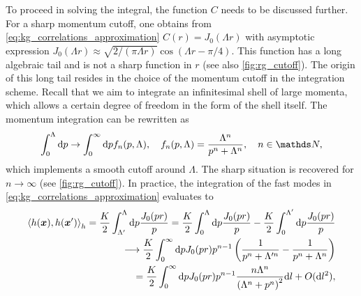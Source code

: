 To proceed in solving the integral, the function $C$ needs to be discussed further.
For a sharp momentum cutoff, one obtains from \cref{eq:kg_correlations_approximation} $C(r) = J_0(\Lambda r)$ with asymptotic expression $J_0(\Lambda r)\approx\sqrt{2/(\pi \Lambda r)}\cos(\Lambda r-\pi/4)$.
This function has a long algebraic tail and is not a sharp function in $r$ (see also \cref{fig:rg_cutoff}).
The origin of this long tail resides in the choice of the momentum cutoff in the integration scheme.
Recall that we aim to integrate an infinitesimal shell of large momenta, which allows a certain degree of freedom in the form of the shell itself.
The momentum integration can be rewritten as
\begin{align}
    \int_{0}^{\Lambda}\rd p \rightarrow \int_{0}^\infty\rd p f_n(p,\Lambda),
    \quad
    f_n(p,\Lambda) = \frac{\Lambda^n}{p^n+\Lambda^n},
    \quad
    n\in\mathds N,
    \label{eq:integral_cutoff}
\end{align}
which implements a smooth cutoff around $\Lambda$.
The sharp situation is recovered for $n\rightarrow\infty$ (see \cref{fig:rg_cutoff}).
In practice, the integration of the fast modes in \cref{eq:kg_correlations_approximation} evaluates to
\begin{align}
    \braket{h({\bm x}),h(\bm x')}_h = \frac K2\int_{\Lambda'}^\Lambda\mathrm d p\frac{J_0(p r)}{p} = \frac K2\int_{0}^\Lambda\mathrm d p\frac{J_0(p r)}{p}
    -\frac K2\int_{0}^{\Lambda'}\mathrm d p\frac{J_0(p r)}{p}
    \\
    \longrightarrow
    \frac K2\int_{0}^\infty\mathrm d p J_0(p r)p^{n-1}\left( \frac1{p^n+\Lambda'^n}-\frac1{p^n+\Lambda^n} \right)
    \\
    =
    \frac K2\int_{0}^\infty\mathrm d p J_0(p r)p^{n-1}\frac{n\Lambda^n}{\left(\Lambda^n+p^n\right)^2}\mathrm d l + O(\mathrm d l^2),
    \label{eq:rg_hxhxpr}
\end{align}
